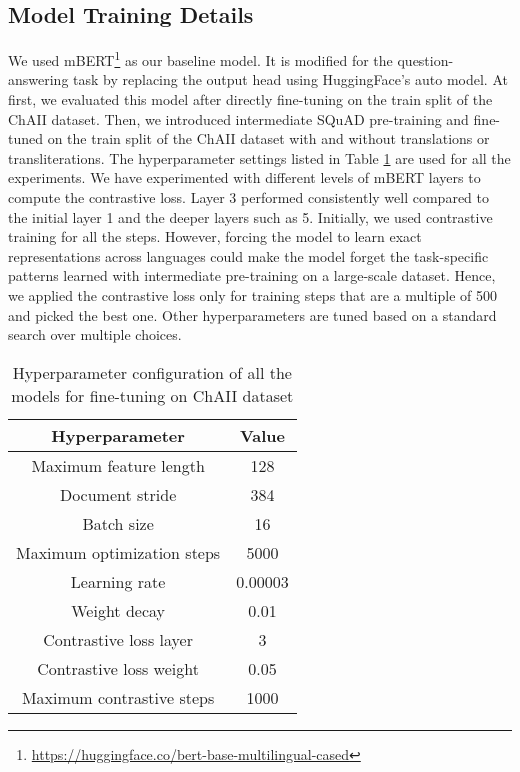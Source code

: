 \documentclass[11pt]{article}
\begin{document}
\subsection{Model Training Details}
We used mBERT\footnote{\url{https://huggingface.co/bert-base-multilingual-cased}} as our baseline model. It is modified for the question-answering task by replacing the output head using HuggingFace's auto model. At first, we evaluated this model after directly fine-tuning on the train split of the ChAII dataset. Then, we introduced intermediate SQuAD pre-training and fine-tuned on the train split of the ChAII dataset with and without translations or transliterations.  The hyperparameter settings listed in Table \ref{tab:hyperparam} are used for all the experiments. We have experimented with different levels of mBERT layers to compute the contrastive loss. Layer 3 performed consistently well compared to the initial layer 1 and the deeper layers such as 5. Initially, we used contrastive training for all the steps. However, forcing the model to learn exact representations across languages could make the model forget the task-specific patterns learned with intermediate pre-training on a large-scale dataset. Hence, we applied the contrastive loss only for training steps that are a multiple of 500 and picked the best one. Other hyperparameters are tuned based on a standard search over multiple choices.

\begin{table}[h]
\begin{center}
\begin{tabular}{c c}
\hline
\textbf{Hyperparameter}         & \textbf{Value}\\ \hline
Maximum feature length & 128                                                 \\
Document stride        &  384                                                   \\
Batch size             & 16                                                   \\
Maximum optimization steps         & 5000                                                  \\
Learning rate          & 0.00003                                           \\
Weight decay           & 0.01              \\
Contrastive loss layer & 3 \\
Contrastive loss weight & 0.05 \\
Maximum contrastive steps & 1000 \\
\hline
\end{tabular}
\caption{Hyperparameter configuration of all the models for fine-tuning on ChAII dataset}
\label{tab:hyperparam}
\end{center}
\end{table}
\end{document}
